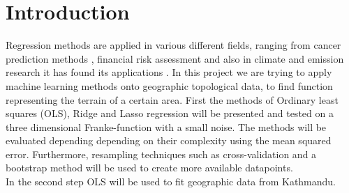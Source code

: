 \section{Introduction} \label{section:Exercise 2}
Regression methods are applied in various different fields, ranging from cancer prediction methods \cite{SHAIKH202240}, financial risk assessment \cite{BROBY2022145} and also in climate and emission research it has found its applications \cite{ZhouYi}. In this project we are trying to apply machine learning methods onto geographic topological data, to find function representing the terrain of a certain area. First the methods of Ordinary least squares (OLS), Ridge and Lasso regression will be presented and tested on a three dimensional Franke-function with a small noise. The methods will be evaluated depending depending on their complexity using the mean squared error. Furthermore, resampling techniques such as cross-validation and a bootstrap method will be used to create more available datapoints. \\
In the second step OLS will be used to fit geographic data from Kathmandu.  \\

